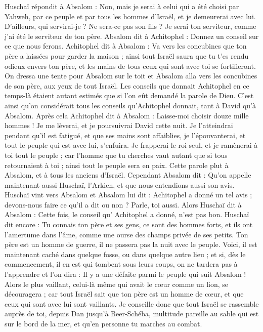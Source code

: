 \begin{multicols}{2}
Huschaï répondit à Absalom : Non, mais je serai à celui qui a été choisi par Yahweh, par ce peuple et par tous les hommes d'Israël, et je demeurerai avec lui.
D’ailleurs, qui servirai-je ? Ne sera-ce pas son fils ? Je serai ton serviteur, comme j'ai été le serviteur de ton père.
Absalom dit à Achitophel : Donnez un conseil sur ce que nous ferons.
Achitophel dit à Absalom : Va vers les concubines que ton père a laissées pour garder la maison ; ainsi tout Israël saura que tu t’es rendu odieux envers ton père, et les mains de tous ceux qui sont avec toi se fortifieront.
On dressa une tente pour Absalom sur le toit et Absalom alla vers les concubines de son père, aux yeux de tout Israël.
Les conseils que donnait Achitophel en ce temps-là étaient autant estimés que si l’on eût demandé la parole de Dieu. C’est ainsi qu'on considérait tous les conseils qu'Achitophel donnait, tant à David qu'à Absalom.
\VerseOne{}Après cela Achitophel dit à Absalom : Laisse-moi choisir douze mille hommes ! Je me lèverai, et je poursuivrai David cette nuit.
Je l’atteindrai pendant qu’il est fatigué, et que ses mains sont affaiblies, je l'épouvanterai, et tout le peuple qui est avec lui, s'enfuira. Je frapperai le roi seul,
et je ramènerai à toi tout le peuple ; car l'homme que tu cherches vaut autant que si tous retournaient à toi ; ainsi tout le peuple sera en paix.
Cette parole plut à Absalom, et à tous les anciens d'Israël.
Cependant Absalom dit : Qu'on appelle maintenant aussi Huschaï, l’Arkien, et que nous entendions aussi son avis.
Huschaï vint vers Absalom et Absalom lui dit : Achitophel a donné un tel avis ; devons-nous faire ce qu'il a dit ou non ? Parle, toi aussi.
Alors Huschaï dit à Absalom : Cette fois, le conseil qu' Achitophel a donné, n'est pas bon.
Huschaï dit encore : Tu connais ton père et ses gens, ce sont des hommes forts, et ils ont l’amertume dans l’âme, comme une ourse des champs privée de ses petits. Ton père est un homme de guerre, il ne passera pas la nuit avec le peuple.
Voici, il est maintenant caché dans quelque fosse, ou dans quelque autre lieu ; et si, dès le commencement, il en est qui tombent sous leurs coups, on ne tardera pas à l'apprendre et l'on dira : Il y a une défaite parmi le peuple qui suit Absalom !
Alors le plus vaillant, celui-là même qui avait le cœur comme un lion, se découragera ; car tout Israël sait que ton père est un homme de cœur, et que ceux qui sont avec lui sont vaillants.
Je conseille donc que tout Israël se rassemble auprès de toi, depuis Dan jusqu'à Beer-Schéba, multitude pareille au sable qui est sur le bord de la mer, et qu’en personne tu marches au combat.

\end{multicols}
